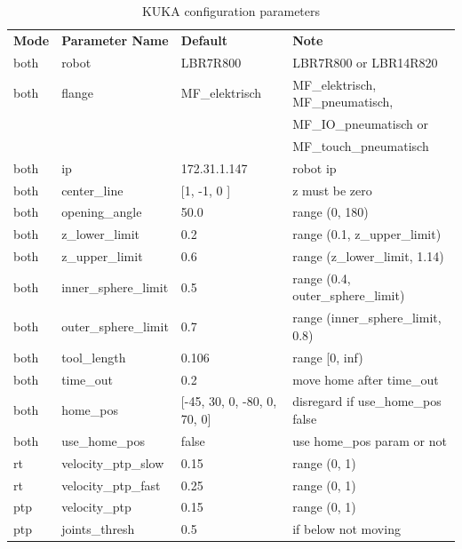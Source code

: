 \documentclass[headsepline,footinclude=false,fontsize=11pt,paper=a4,listof=totoc,bibliography=totoc,BCOR=12mm,DIV=14]{scrbook}
\begin{document}
\begin{table}[h]
\centering
\begin{tabular}{llll}
\textbf{Mode} & \textbf{Parameter Name} & \textbf{Default}                & \textbf{Note}                     \\

both          & robot                   & LBR7R800	                      & LBR7R800 or LBR14R820             \\
both          & flange                  & MF\_elektrisch                   & MF\_elektrisch, MF\_pneumatisch,\\&&& MF\_IO\_pneumatisch or \\&&&MF\_touch\_pneumatisch\\
both          & ip                      & 172.31.1.147                    & robot ip                                 \\
both          & center\_line            & {[}1, -1, 0	  {]}             & z must be zero               \\
both          & opening\_angle          & 50.0                            & range (0, 180)                    \\
both          & z\_lower\_limit         & 0.2                             & range (0.1, z\_upper\_limit)      \\
both          & z\_upper\_limit         & 0.6                             & range (z\_lower\_limit, 1.14)     \\
both          & inner\_sphere\_limit    & 0.5                             & range (0.4, outer\_sphere\_limit) \\
both          & outer\_sphere\_limit    & 0.7                             & range (inner\_sphere\_limit, 0.8) \\
both          & tool\_length            & 0.106                           & range {[}0, inf)                  \\
both 		  & time\_out				& 0.2						      & move home after time\_out \\
both          & home\_pos               & {[}-45, 30, 0, -80, 0, 70, 0{]} & disregard if use\_home\_pos false         \\
both          & use\_home\_pos       & false                           & use home\_pos param or not        \\
rt            & velocity\_ptp\_slow     & 0.15                            & range (0, 1)                      \\
rt            & velocity\_ptp\_fast     & 0.25                            & range (0, 1)                      \\
ptp           & velocity\_ptp           & 0.15                            & range (0, 1)                      \\
ptp           & joints\_thresh          & 0.5                             & if below not moving              
\end{tabular}
\caption{KUKA configuration parameters}
\label{tab:kuka_config}
\end{table}
\end{document}
